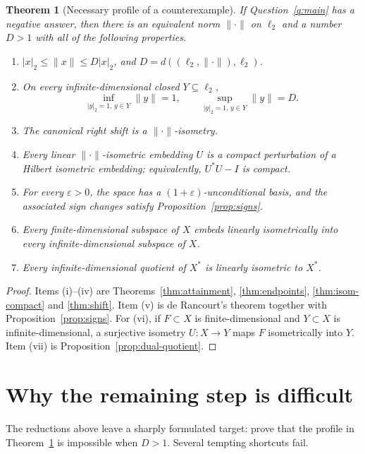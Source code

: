 \documentclass[11pt]{article}
\newtheorem{theorem}{Theorem}[section]
\theoremstyle{definition}
\begin{document}
\begin{theorem}[Necessary profile of a counterexample]\label{thm:profile}
If Question~\ref{q:main} has a negative answer, then there is an equivalent norm
$\|\cdot\|$ on $\ell_2$ and a number $D>1$ with all of the following properties.
\begin{enumerate}[label=\textup{(\roman*)}]
\item $|x|_2\leq\|x\|\leq D|x|_2$, and $D=d((\ell_2,\|\cdot\|),\ell_2)$.
\item On every infinite-dimensional closed $Y\subseteq\ell_2$,
\[
 \inf_{|y|_2=1,\,y\in Y}\|y\|=1,
 \qquad
 \sup_{|y|_2=1,\,y\in Y}\|y\|=D.
\]
\item The canonical right shift is a $\|\cdot\|$-isometry.
\item Every linear $\|\cdot\|$-isometric embedding $U$ is a compact
perturbation of a Hilbert isometric embedding; equivalently,
$U^*U-I$ is compact.
\item For every $\varepsilon>0$, the space has a
$(1+\varepsilon)$-unconditional basis, and the associated sign changes satisfy
Proposition~\ref{prop:signs}.
\item Every finite-dimensional subspace of $X$ embeds linearly isometrically
into every infinite-dimensional subspace of $X$.
\item Every infinite-dimensional quotient of $X^*$ is linearly isometric to
$X^*$.
\end{enumerate}
\end{theorem}

\begin{proof}
Items (i)--(iv) are Theorems~\ref{thm:attainment},
\ref{thm:endpoints}, \ref{thm:isom-compact} and \ref{thm:shift}.  Item (v) is
de Rancourt's theorem together with Proposition~\ref{prop:signs}.  For (vi), if
$F\subset X$ is finite-dimensional and $Y\subset X$ is infinite-dimensional,
a surjective isometry $U:X\to Y$ maps $F$ isometrically into $Y$.  Item (vii)
is Proposition~\ref{prop:dual-quotient}.
\end{proof}

\section{Why the remaining step is difficult}\label{sec:bottlenecks}

The reductions above leave a sharply formulated target: prove that the profile
in Theorem~\ref{thm:profile} is impossible when $D>1$.  Several tempting
shortcuts fail.
\end{document}
